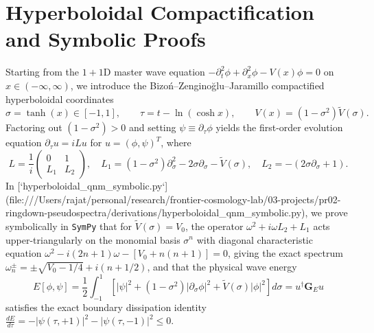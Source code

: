 \documentclass[11pt,a4paper]{article}
\begin{document}
\section{Hyperboloidal Compactification and Symbolic Proofs}
Starting from the $1+1$D master wave equation $-\partial_t^2\phi + \partial_x^2\phi - V(x)\phi = 0$ on $x \in (-\infty, \infty)$, we introduce the Bizo\'n--Zengino\u{g}lu--Jaramillo compactified hyperboloidal coordinates \cite{Jaramillo:2020pseudospectrum}
\begin{equation}
    \sigma = \tanh(x) \in [-1, 1], \qquad \tau = t - \ln(\cosh x), \qquad V(x) = (1 - \sigma^2)\tilde{V}(\sigma).
\end{equation}
Factoring out $(1 - \sigma^2) > 0$ and setting $\psi \equiv \partial_\tau\phi$ yields the first-order evolution equation $\partial_\tau u = i L u$ for $u = (\phi, \psi)^T$, where
\begin{equation}
    L = \frac{1}{i}\begin{pmatrix} 0 & 1 \\ L_1 & L_2 \end{pmatrix}, \quad L_1 = (1 - \sigma^2)\partial_\sigma^2 - 2\sigma\partial_\sigma - \tilde{V}(\sigma), \quad L_2 = -(2\sigma\partial_\sigma + 1).
\end{equation}
In [`hyperboloidal_qnm_symbolic.py`](file:///Users/rajat/personal/research/frontier-cosmology-lab/03-projects/pr02-ringdown-pseudospectra/derivations/hyperboloidal_qnm_symbolic.py), we prove symbolically in \texttt{SymPy} that for $\tilde{V}(\sigma) = V_0$, the operator $\omega^2 + i\omega L_2 + L_1$ acts upper-triangularly on the monomial basis $\sigma^n$ with diagonal characteristic equation $\omega^2 - i(2n+1)\omega - [V_0 + n(n+1)] = 0$, giving the exact spectrum $\omega_n^{\pm} = \pm\sqrt{V_0 - 1/4} + i(n + 1/2)$, and that the physical wave energy
\begin{equation}
    E[\phi, \psi] = \frac{1}{2}\int_{-1}^{1} \left[ |\psi|^2 + (1 - \sigma^2)|\partial_\sigma\phi|^2 + \tilde{V}(\sigma)|\phi|^2 \right] d\sigma = u^\dagger \mathbf{G}_E u
\end{equation}
satisfies the exact boundary dissipation identity $\frac{dE}{d\tau} = -|\psi(\tau, +1)|^2 - |\psi(\tau, -1)|^2 \le 0$.
\end{document}
